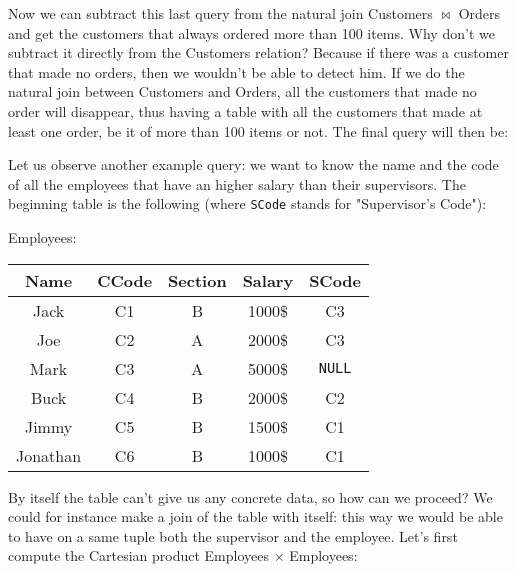 Now we can subtract this last query from the natural join Customers $\bowtie$ Orders and get the customers that always ordered more than 100 items. Why don't we subtract it directly from the Customers relation? Because if there was a customer that made no orders, then we wouldn't be able to detect him. If we do the natural join between Customers and Orders, all the customers that made no order will disappear, thus having a table with all the customers that made at least one order, be it of more than 100 items or not. The final query will then be:
\begin{center}
\end{center}

Let us observe another example query: we want to know the name and the code of all the employees that have an higher salary than their supervisors. The beginning table is the following (where \texttt{SCode} stands for "Supervisor's Code"):
\begin{center}
    Employees: \quad \begin{tabular}{|c|c|c|c|c|}
        \hline \rowcolor{maindoccol!60}
        \textbf{Name} & \textbf{CCode} & \textbf{Section} & \textbf{Salary} & \textbf{SCode} \\
        \hline
        Jack & C1 & B & 1000\$ & C3 \\
        \hline
        Joe & C2 & A & 2000\$ & C3 \\
        \hline
        Mark & C3 & A & 5000\$ & \texttt{NULL} \\
        \hline
        Buck & C4 & B & 2000\$ & C2 \\
        \hline
        Jimmy & C5 & B & 1500\$ & C1 \\
        \hline
        Jonathan & C6 & B & 1000\$ & C1 \\
        \hline
    \end{tabular}
\end{center}

By itself the table can't give us any concrete data, so how can we proceed? We could for instance make a join of the table with itself: this way we would be able to have on a same tuple both the supervisor and the employee. Let's first compute the Cartesian product Employees $\times$ Employees:

